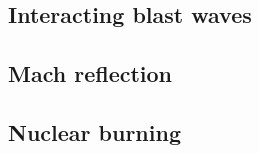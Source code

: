 \documentclass[]{article}
\begin{document}

    \subsection*{Interacting blast waves}

    \subsection*{Mach reflection}

    \subsection*{Nuclear burning}
\end{document}
